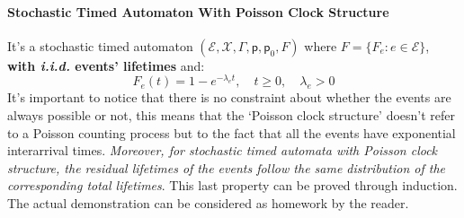 \documentclass[12pt,a4paper]{article}
\newcommand*{\transp}{\mathsf{p}}
\begin{document}
\paragraph{Stochastic Timed Automaton With Poisson Clock Structure}
It's a stochastic timed automaton 
$(\mathcal{E},\mathcal{X},\Gamma,\transp,\transp_0,F)$ where $F = \{F_e : e \in \mathcal{E}\}$, \textbf{with \textit{i.i.d.} events' lifetimes} and:
$$
F_e(t)=1-e^{-\lambda_e t}, \quad t\geq 0, \quad \lambda_e>0
$$
It's important to notice that there is no constraint about whether the events are always possible or not, this means that the `Poisson clock structure' doesn't refer to a Poisson counting process but to the fact that all the events have exponential interarrival times.
\emph{Moreover, for stochastic timed automata with Poisson clock structure, the residual lifetimes of the events follow the same distribution of the corresponding total lifetimes}. This last property can be proved through induction. The actual demonstration can be considered as homework by the reader.
\end{document}
